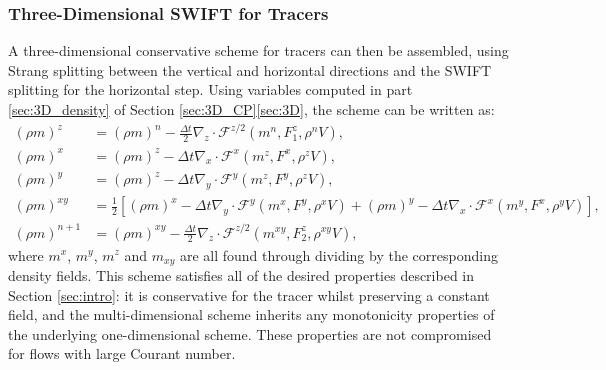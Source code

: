 \documentclass{ametsocV6.1}
\begin{document}
\subsubsection{Three-Dimensional SWIFT for Tracers}
A three-dimensional conservative scheme for tracers can then be assembled, using Strang splitting between the vertical and horizontal directions and the SWIFT splitting for the horizontal step.
Using variables computed in part \ref{sec:3D_density} of Section \ref{sec:3D_CP}\ref{sec:3D}, the scheme can be written as:
\begin{subequations}
\begin{align}
(\rho m)^z & = (\rho m)^n - \tfrac{\Delta t}{2}\nabla_z \cdot \mathcal{F}^{z/2}\left(m^n, F^z_1, \rho^nV\right), \\
(\rho m)^x & = (\rho m)^z - \Delta t \nabla_x \cdot \mathcal{F}^x\left(m^z, F^x, \rho^zV \right), \\
(\rho m)^y & = (\rho m)^z - \Delta t \nabla_y \cdot \mathcal{F}^y\left(m^z, F^y, \rho^zV \right), \\
(\rho m)^{xy} & = \frac{1}{2}\left[(\rho m)^x - \Delta t \nabla_y \cdot \mathcal{F}^y\left(m^x, F^y, \rho^xV \right) + (\rho m)^y - \Delta t \nabla_x \cdot \mathcal{F}^x\left(m^y, F^x,\rho^yV\right)\right], \\
(\rho m)^{n+1} & = (\rho m)^{xy} - \tfrac{\Delta t}{2}\nabla_z\cdot\mathcal{F}^{z/2}\left(m^{xy},F_2^z,\rho^{xy}V\right),
\end{align}
\end{subequations}
where $m^x$, $m^y$, $m^z$ and $m_{xy}$ are all found through dividing by the corresponding density fields.
This scheme satisfies all of the desired properties described in Section \ref{sec:intro}: it is conservative for the tracer whilst preserving a constant field, and the multi-dimensional scheme inherits any monotonicity properties of the underlying one-dimensional scheme.
These properties are not compromised for flows with large Courant number.
\end{document}

